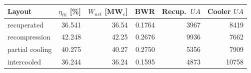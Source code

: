 \begin{tabular}{@{}lrrrrr@{}}
\toprule
Layout & $\eta_{th}$ [\%] & $W_{net}$ [MW$_e$] & BWR & Recup.\ $UA$ & Cooler $UA$ \\
\midrule
recuperated & 36.541 & 36.54 & 0.1764 & 3967 & 8419 \\
recompression & 42.248 & 42.25 & 0.2676 & 9936 & 7662 \\
partial cooling & 40.275 & 40.27 & 0.2750 & 5356 & 7909 \\
intercooled & 36.244 & 36.24 & 0.1595 & 4873 & 10758 \\
\bottomrule
\end{tabular}
